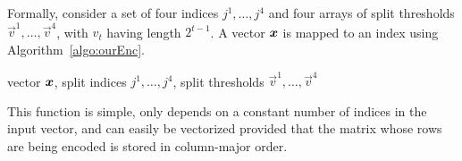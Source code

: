 Formally, consider a set of four indices ${j^1,\ldots,j^4}$ and four arrays of split thresholds $\vec{v}^1,\ldots,\vec{v}^4$, with $v_t$ having length $2^{t-1}$. A vector $\bm{x}$ is mapped to an index using Algorithm~\ref{algo:ourEnc}.
\begin{algorithm}[t]
\caption{\oursHash} \label{algo:ourEnc}
\begin{algorithmic}[1]
     vector $\bm{x}$, split indices ${j^1,\ldots,j^4}$, split thresholds $\vec{v}^1,\ldots,\vec{v}^4$
      
       
      
     
    \ENDFOR
\end{algorithmic}
\end{algorithm}
This function is simple, only depends on a constant number of indices in the input vector, and can easily be vectorized provided that the matrix whose rows are being encoded is stored in column-major order. %


